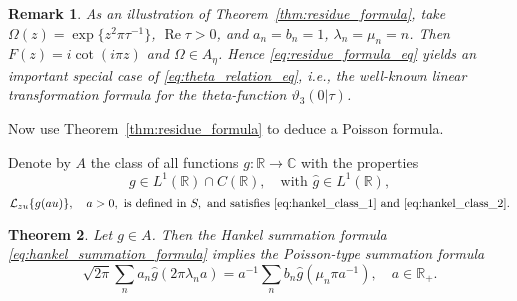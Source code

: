 \documentclass[11pt]{article}
\theoremstyle{plain}
\newtheorem{theorem}{Theorem}
\newtheorem{remark}[theorem]{Remark}
\begin{document}
\begin{remark}
\label{rem:theta_special}
As an illustration of Theorem~\ref{thm:residue_formula}, take $\Omega(z) = \exp\{z^2 \pi \tau^{-1}\}$, $\operatorname{Re} \tau > 0$, and $a_n = b_n = 1$, $\lambda_n = \mu_n = n$. Then $F(z) = i \cot(i\pi z)$ and $\Omega \in A_\eta$. Hence \eqref{eq:residue_formula_eq} yields an important special case of \eqref{eq:theta_relation_eq}, i.e., the well-known linear transformation formula for the theta-function $\vartheta_3(0|\tau)$.
\end{remark}

Now use Theorem~\ref{thm:residue_formula} to deduce a Poisson formula.

Denote by $A$ the class of all functions $g: \mathbb{R} \to \mathbb{C}$ with the properties
\begin{equation}
g \in L^1(\mathbb{R}) \cap C(\mathbb{R}), \quad \text{with } \hat{g} \in L^1(\mathbb{R}),
\label{eq:class_A_prop_1}
\end{equation}
\begin{equation}
\mathcal{L}_{zu}\{g(au)\}, \quad a > 0, \text{ is defined in } S, \text{ and satisfies } \eqref{eq:hankel_class_1} \text{ and } \eqref{eq:hankel_class_2}.
\label{eq:class_A_prop_2}
\end{equation}

\begin{theorem}
\label{thm:poisson_type}
Let $g \in A$. Then the Hankel summation formula \eqref{eq:hankel_summation_formula} implies the Poisson-type summation formula
\begin{equation}
\sqrt{2\pi} \sum_{n} a_n \hat{g}(2\pi \lambda_n a) = a^{-1} \sum_{n} b_n \hat{g}(\mu_n \pi a^{-1}), \quad a \in \mathbb{R}_+.
\label{eq:poisson_summation}
\end{equation}
\end{theorem}
\end{document}
